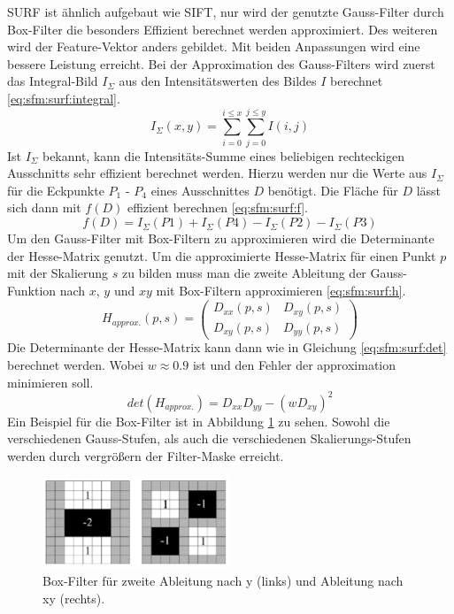 \documentclass[12pt,titlepage, twoside]{article}
\begin{document}
SURF ist ähnlich aufgebaut wie SIFT, nur wird der genutzte Gauss-Filter durch Box-Filter die besonders Effizient berechnet werden approximiert.
Des weiteren wird der Feature-Vektor anders gebildet. Mit beiden Anpassungen wird eine bessere Leistung erreicht.
Bei der Approximation des Gauss-Filters wird zuerst das Integral-Bild $I_\Sigma$ aus den Intensitätswerten des Bildes $I$ berechnet \ref{eq:sfm:surf:integral}.
\begin{equation}
    \label{eq:sfm:surf:integral}
    I_\Sigma (x,y) = \sum_{i=0}^{i\leq x}\sum_{j=0}^{j\leq y}I(i,j)
\end{equation}
Ist $I_\Sigma$ bekannt, kann die Intensitäts-Summe eines beliebigen rechteckigen Ausschnitts sehr effizient berechnet werden. 
Hierzu werden nur die Werte aus $I_\Sigma$ für die Eckpunkte $P_1$ - $P_4$ eines Ausschnittes $D$ benötigt.
Die Fläche für $D$ lässt sich dann mit $f(D)$ effizient berechnen \ref{eq:sfm:surf:f}.
\begin{equation}
    \label{eq:sfm:surf:f}
    f(D) = I_\Sigma(P1) + I_\Sigma(P4) - I_\Sigma(P2) - I_\Sigma(P3)
\end{equation}
Um den Gauss-Filter mit Box-Filtern zu approximieren wird die Determinante der Hesse-Matrix genutzt. 
Um die approximierte Hesse-Matrix für einen Punkt $p$ mit der Skalierung $s$ zu bilden muss man die zweite Ableitung der Gauss-Funktion nach $x$, $y$ und $xy$ mit Box-Filtern approximieren \ref{eq:sfm:surf:h}.
\begin{equation}
    \label{eq:sfm:surf:h}
    H_{approx.}(p,s) = \left( \begin{smallmatrix} D_{xx}(p,s)&D_{xy}(p,s)\\ D_{xy}(p,s)&D_{yy}(p,s) \end{smallmatrix} \right)
\end{equation}
Die Determinante der Hesse-Matrix kann dann wie in Gleichung \ref{eq:sfm:surf:det} berechnet werden. Wobei $w\approx 0.9$ ist und den Fehler der approximation minimieren soll.
\begin{equation}
    \label{eq:sfm:surf:det}
    det(H_{approx.}) = D_{xx}D_{yy}-(wD_{xy})^2
\end{equation}
Ein Beispiel für die Box-Filter ist in Abbildung \ref{fig:surf:filter} zu sehen. Sowohl die verschiedenen Gauss-Stufen, als auch die verschiedenen Skalierungs-Stufen werden durch vergrößern der Filter-Maske erreicht.
\begin{figure}
    \centering
    \includegraphics[width=0.5\textwidth]{./Images/SURF_BoxFilter.png}
    \caption{Box-Filter für zweite Ableitung nach y (links) und Ableitung nach xy (rechts). \cite{SURF}}
    \label{fig:surf:filter}
\end{figure}
\end{document}
